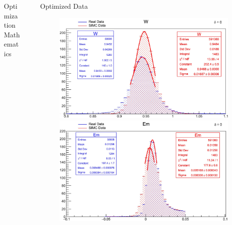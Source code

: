 \documentclass[final]{beamer}
\newlength{\sepwidth}
\newlength{\colwidth}
\newcommand{\separatorcolumn}{\begin{column}{\sepwidth}\end{column}}
\begin{document}
\begin{frame}[t]
\begin{columns}[t]
\begin{column}{\colwidth}
\begin{exampleblock}{Optimization Mathematics}
\end{exampleblock}

\end{column}

\separatorcolumn

\begin{column}{\colwidth}
\vspace{-0.5cm}
\begin{block}{Optimized Data}
\vspace{-.5cm}
\begin{figure}
  \centering

  \begin{minipage}[t]{0.49\textwidth}
    \includegraphics[width=\linewidth]{calibrated data/model 0/W_0.jpg}
  \end{minipage}
  \hfill
  \begin{minipage}[t]{0.5\textwidth}
    \includegraphics[width=\linewidth]{calibrated data/model 0/Em_0.jpg}
  \end{minipage}


\end{figure}
\end{block}
\end{column}
\end{columns}
\end{frame}
\end{document}
